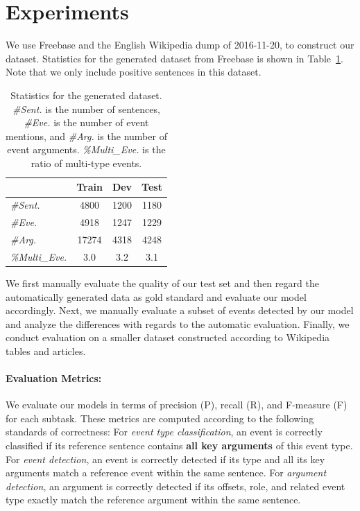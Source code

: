 \section{Experiments}
We use Freebase and the English Wikipedia dump of 2016-11-20, to construct our dataset. Statistics for the generated dataset from Freebase is shown in Table~\ref{statistics}. Note that we only include positive sentences in this dataset. 
\begin{table}
\small
\centering
\begin{tabular}{|l|c|c|c|} \hline
& Train & Dev & Test \\ \hline
\emph{\#Sent.} & 4800 & 1200 & 1180 \\ \hline
\emph{\#Eve.} & 4918 & 1247 & 1229 \\ \hline
\emph{\#Arg.} & 17274 & 4318 & 4248 \\ \hline
\emph{\%Multi\_Eve.} & 3.0 & 3.2 & 3.1 \\ \hline
\end{tabular}	
\caption{Statistics for the generated dataset. \emph{\#Sent.} is the number of sentences, \emph{\#Eve.} is the number of event mentions, and \emph{\#Arg.} is the number of event arguments. \emph{\%Multi\_Eve.} is the ratio of multi-type events.
\label{statistics}}
\vspace{-0.5em}
\end{table}

We first manually evaluate the quality of our test set and then regard the automatically generated data as gold standard and evaluate our model accordingly. Next, we manually evaluate a subset of events detected by our model and analyze the differences with regards to the automatic evaluation. Finally, we conduct evaluation on a smaller dataset constructed according to Wikipedia tables and articles. 

\paragraph{Evaluation Metrics:} We evaluate our models in terms of precision (P), recall (R), and F-measure (F) for each subtask. These metrics are computed according to the following standards of correctness: 
For \emph{event type classification}, an event is correctly classified if its reference sentence contains \textbf{all key arguments} of this event type. 
For \emph{event detection}, an event is correctly detected if its type and all its key arguments match a reference event within the same sentence.
For \emph{argument detection}, an argument is correctly detected if its offsets, role, and related event type exactly match the reference argument within the same sentence. 

